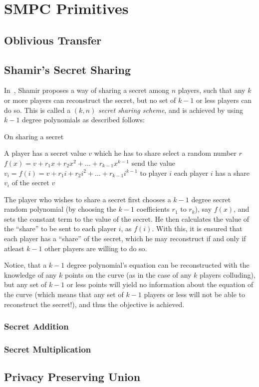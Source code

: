 

\section{SMPC Primitives}
\label{sec:smpc-prim}

\subsection{Oblivious Transfer}
\label{sec:ot-prim}

\subsection{Shamir's Secret Sharing}
\label{sec:sss-prim}
In~\cite{S79:HtSaS}, Shamir proposes a way of sharing a secret among $n$ 
players, such that any $k$ or more players can reconstruct the secret,
but no set of $k-1$ or less players can do so. This is called a $(k,n)$ 
{\it secret sharing scheme}, and is achieved by using $k-1$ degree polynomials
as described follows: 

\begin{algorithm}
\caption{On sharing a secret}
\label{algshare}
\begin{algorithmic}
\REQUIRE A player has a secret value $v$ which he has to share
\STATE select a random number $r$
\STATE $f(x) = v + r_{1}x + r_{2}x^{2} + \ldots + r_{k-1}x^{k-1}$
	\STATE send the value $v_{i}= f(i) = v + r_{1}i + r_{2}i^{2} + \ldots + r_{k-1}i^{k-1}$ to player $i$
\ENDFOR
\ENSURE each player $i$ has a share $v_{i}$ of the secret $v$
\end{algorithmic}
\end{algorithm}

The player who wishes to share a secret first chooses a $k-1$ degree
secret random polynomial (by choosing the $k-1$ coefficients $r_1$ to $r_k$),
say $f(x)$,
and sets the constant term to the value of the secret. He then calculates
the value of the ``share'' to be sent to each player $i$, as $f(i)$. With
this, it is ensured that each player has a ``share'' of the secret, which
he may reconstruct if and only if atleast $k-1$ other players are willing
to do so.

Notice, that
a $k-1$ degree polynomial's equation can be reconstructed with the knowledge
of any $k$ points on the curve (as in the case of any $k$ players colluding),
but any set of $k-1$ or less points will yield no information
about the equation of the curve (which means that any set of $k-1$ players
or less will not be able to reconstruct the secret!), and thus the objective
is achieved.

\subsubsection{Secret Addition}
\label{sec:add-prim}

\subsubsection{Secret Multiplication}
\label{sec:mult-prim}

\subsection{Privacy Preserving Union}
\label{sec:union-prim}
